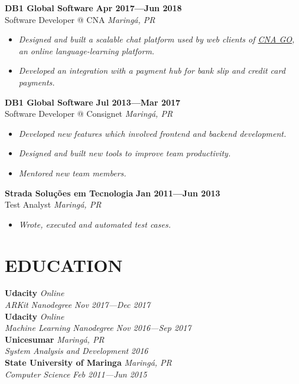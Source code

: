 \documentclass[line,margin]{res}
\begin{document}
\begin{resume}
  {\bf DB1 Global Software} \hfill {\bf Apr 2017---Jun 2018} \\
  Software Developer @ CNA \hfill {\sl Maring\'a, PR}\\[-6pt]
  \begin{itemize}
    \item {\sl Designed and built a scalable chat platform used by web clients of \href{https://www.cnago.com.br}{CNA GO}, an online language-learning platform.}
    \item {\sl Developed an integration with a payment hub for
               bank slip and credit card payments.}
  \end{itemize}

  {\bf DB1 Global Software} \hfill {\bf Jul 2013---Mar 2017} \\
  Software Developer @ Consignet \hfill {\sl Maring\'a, PR}\\[-6pt]
  \begin{itemize}
    \item {\sl Developed new features which involved
               frontend and backend development.}
    \item {\sl Designed and built new tools to improve team productivity.}
    \item {\sl Mentored new team members.}
  \end{itemize}

  {\bf Strada Solu\c{c}\~oes em Tecnologia} \hfill {\bf Jan 2011---Jun 2013} \\
  Test Analyst \hfill {\sl Maring\'a, PR}\\[-6pt]
    \begin{itemize}
    \item {\sl Wrote, executed and automated test cases.}
  \end{itemize}


\section{EDUCATION}
  {\bf Udacity} \hfill {\sl Online} \\
  {\sl ARKit Nanodegree} \hfill {\sl Nov 2017---Dec 2017}\\[6pt]
  {\bf Udacity} \hfill {\sl Online} \\
  {\sl Machine Learning Nanodegree} \hfill {\sl Nov 2016---Sep 2017}\\[6pt]
  {\bf Unicesumar} \hfill {\sl Maring\'a, PR} \\
  {\sl System Analysis and Development} \hfill {\sl 2016}\\[6pt]
  {\bf State University of Maringa} \hfill {\sl Maring\'a, PR} \\
  {\sl Computer Science} \hfill {\sl Feb 2011---Jun 2015}



\end{resume}
\end{document}
